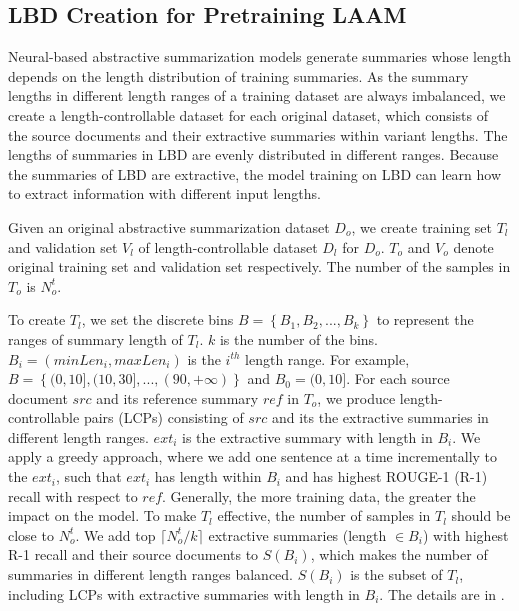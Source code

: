 \subsection{LBD Creation for Pretraining LAAM}
\label{sec:lbd}
Neural-based abstractive summarization models
generate summaries whose length depends on the length distribution of training summaries.
As the summary lengths in different length ranges of a training dataset 
are always imbalanced,
we create a length-controllable dataset for each original dataset, which consists of the source documents and 
their extractive summaries within variant lengths. The lengths of summaries in LBD are evenly distributed in different ranges. 
Because the summaries of LBD are extractive, the model training on LBD can learn how to extract information with different input lengths.

Given an original abstractive summarization dataset $D_o$, we create training set $T_{l}$ and validation set $V_{l}$ of length-controllable dataset $D_l$ for $D_o$. 
$T_{o}$ and $V_{o}$ denote original training set and validation set respectively.
The number of the samples in $T_{o}$ is $N_{o}^t$.

To create $T_{l}$, 
we set the discrete bins $B=\left\{B_1, B_2,...,B_k\right\}$ to represent the ranges of summary length of $T_{l}$. 
$k$ is the number of the bins. 
$B_i=\left(minLen_i, maxLen_i\right)$ is the $i^{th}$ length range. 
For example, $B=\left\{(0,10],(10,30],...,(90, +\infty)\right\}$ and $B_0=(0,10]$. 
For each source document $src$ and its reference summary $ref$ in $T_{o}$,
we produce length-controllable pairs (LCPs) consisting of $src$ and its the 
extractive summaries in different length ranges.
$ext_i$ is the extractive summary with length in $B_i$.
We apply a greedy approach,
where we add one sentence at a time incrementally to the $ext_i$, 
such that $ext_i$ has length within $B_i$ and has highest ROUGE-1 (R-1) recall with respect to $ref$.
Generally, the more training data, the greater the impact on the model.
To make $T_{l}$ effective,
the number of samples in $T_{l}$ should be close to $N_{o}^t$.
We add top $\lceil N_{o}^t/k \rceil$ extractive summaries (length $\in B_i$) 
with highest R-1 recall and their source documents to $S(B_i)$,
which makes the number of summaries in different length ranges balanced.
$S(B_i)$ is the subset of $T_{l}$, including LCPs with extractive summaries with length in $B_i$. 
The details are in .


